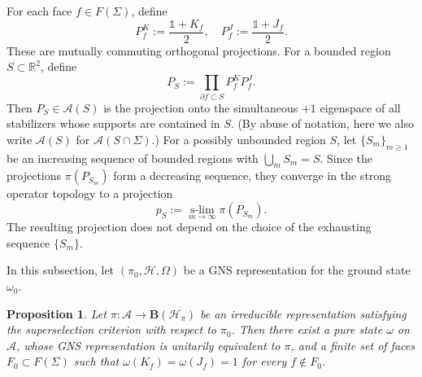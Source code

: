 \documentclass[a4paper,11pt]{article}
\newtheorem{proposition}[theorem]{Proposition}
\theoremstyle{definition}
\theoremstyle{remark}
\theoremstyle{remark}
\begin{document}
For each face $f\in F(\Sigma)$, define
\[
    P_f^K:=\frac{\mathds{1}+K_f}{2}, \quad P_f^J:=\frac{\mathds{1}+J_f}{2}.
\]
These are mutually commuting orthogonal projections. For a bounded region $S\subset\mathbb R^2$, define
\[
    P_S := \prod_{\partial f\subset S}P_f^K P_f^J.
\]
Then $P_S\in\mathcal A(S)$ is the projection onto the simultaneous $+1$ eigenspace of all stabilizers whose supports are contained in $S$. (By abuse of notation, here we also write $\mathcal{A}(S)$ for $\mathcal{A}(S\cap\Sigma)$.) For a possibly unbounded region $S$, let $\{S_m\}_{m\geq1}$ be an increasing sequence of bounded regions with $\bigcup_m S_m=S$. Since the projections $\pi(P_{S_m})$ form a decreasing sequence, they converge in the strong operator topology to a projection
\[
    p_S:=\operatorname*{s-lim}_{m\to\infty}\pi(P_{S_m}).
\]
The resulting projection does not depend on the choice of the exhausting sequence $\{S_m\}$.

In this subsection, let $(\pi_0,\mathcal{H},\Omega)$ be a GNS representation for the ground state $\omega_0$. 

\begin{proposition}\label{prop:finite_stabilizer_violations}
    Let $\pi:\mathcal A\to\mathbf B(\mathcal H_\pi)$ be an irreducible representation satisfying the superselection criterion with respect to $\pi_0$. Then there exist a pure state $\omega$ on $\mathcal A$, whose GNS representation is unitarily equivalent to $\pi$, and a finite set of faces $F_0\subset F(\Sigma)$ such that $\omega(K_f)=\omega(J_f)=1$ for every $f\notin F_0$.
\end{proposition}
\end{document}

